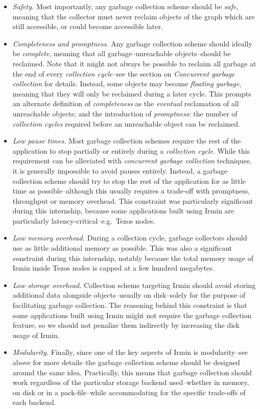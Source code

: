 \begin{itemize}
  \item \emph{Safety.}
        Most importantly, any garbage collection scheme should be \emph{safe}, meaning that the collector must never reclaim objects of the graph which are still accessible, or could become accessible later.

  \item \emph{Completeness and promptness.}
        Any garbage collection scheme should ideally be \emph{complete}, meaning that all garbage--unreachable objects--should be reclaimed. Note that it might not always be possible to reclaim all garbage at the end of every \emph{collection cycle}--see the section on \emph{Concurrent garbage collection} for details. Instead, some objects may become \emph{floating garbage}, meaning that they will only be reclaimed during a later cycle. This prompts an alternate definition of \emph{completeness} as the \emph{eventual} reclamation of all unreachable objects; and the introduction of \emph{promptness}: the number of \emph{collection cycles} required before an unreachable object can be reclaimed.

  \item \emph{Low pause times.}
        Most garbage collection schemes require the rest of the application to stop partially or entirely during a \emph{collection cycle}. While this requirement can be alleviated with \emph{concurrent garbage collection} techniques, it is generally impossible to avoid pauses entirely. Instead, a garbage collection scheme should try to stop the rest of the application for as little time as possible--although this usually requires a trade-off with promptness, throughput or memory overhead. This constraint was particularly significant during this internship, because some applications built using Irmin are particularly latency-critical--e.g.~Tezos nodes.

  \item \emph{Low memory overhead.}
        During a collection cycle, garbage collectors should use as little additional memory as possible. This was also a significant constraint during this internship, notably because the total memory usage of Irmin inside Tezos nodes is capped at a few hundred megabytes.

  \item \emph{Low storage overhead.}
        Collection scheme targeting Irmin should avoid storing additional data alongside objects--usually on disk--solely for the purpose of facilitating garbage collection. The reasoning behind this constraint is that some applications built using Irmin might not require the garbage collection feature, so we should not penalize them indirectly by increasing the disk usage of Irmin.

  \item \emph{Modularity.}
        Finally, since one of the key aspects of Irmin is modularity--see above for more details--the garbage collection scheme should be designed around the same idea. Practically, this means that garbage collection should work regardless of the particular storage backend used--whether in memory, on disk or in a pack-file--while accommodating for the specific trade-offs of each backend.
\end{itemize}
